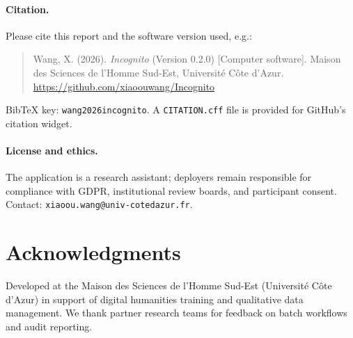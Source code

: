 \documentclass[11pt,a4paper]{article}
\begin{document}
\paragraph{Citation.}
Please cite this report and the software version used, e.g.:
\begin{quote}
\small
Wang, X. (2026).
\textit{Incognito} (Version 0.2.0) [Computer software].
Maison des Sciences de l'Homme Sud-Est, Universit\'{e} C\^{o}te d'Azur.
\url{https://github.com/xiaoouwang/Incognito}
\end{quote}
\noindent Bib\TeX{} key: \texttt{wang2026incognito}.
A \texttt{CITATION.cff} file is provided for GitHub's citation widget.

\paragraph{License and ethics.}
The application is a research assistant; deployers remain responsible for compliance
with GDPR, institutional review boards, and participant consent.
Contact: \texttt{xiaoou.wang@univ-cotedazur.fr}.

\section*{Acknowledgments}

Developed at the Maison des Sciences de l'Homme Sud-Est (Universit\'{e} C\^{o}te
d'Azur) in support of digital humanities training and qualitative data management.
We thank partner research teams for feedback on batch workflows and audit reporting.



\end{document}
